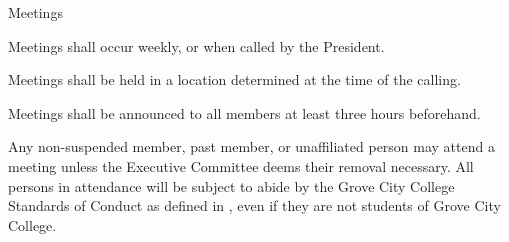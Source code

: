 {
	\begin{article}{Meetings}
		\item Meetings shall occur weekly, or when called by the President.
		\item Meetings shall be held in a location determined at the time of the calling.
		\item Meetings shall be announced to all members at least three hours beforehand.
		\item Any non-suspended member, past member, or unaffiliated person may attend a meeting unless the Executive Committee deems their removal necessary. All persons in attendance will be subject to abide by the Grove City College Standards of Conduct as defined in \crimson, even if they are not students of Grove City College.
	\end{article}
}